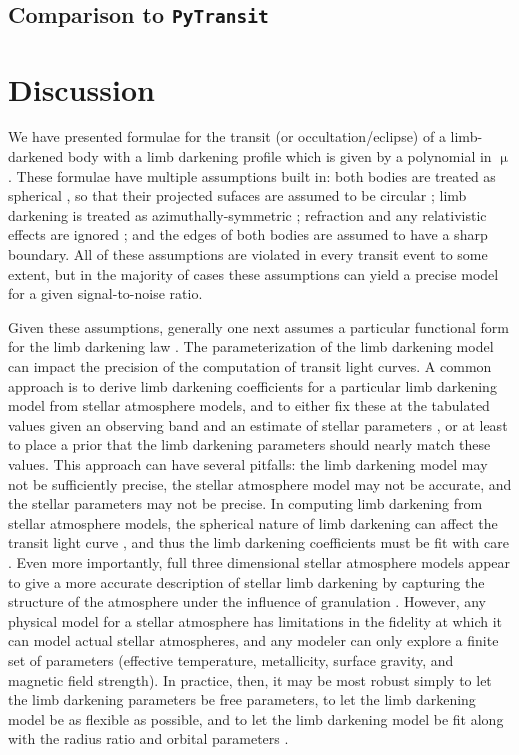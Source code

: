 \documentclass[modern]{aastex61}
\begin{document}
\subsection{Comparison to \texttt{PyTransit}}

\section{Discussion}

We have presented formulae for the transit (or occultation/eclipse) of a
limb-darkened body with a limb darkening profile which is given by a polynomial
in $\upmu$.  These formulae have multiple assumptions built in:  both bodies
are treated as spherical \citep[but see][]{Seager2002,Hui2002}, so that their projected
sufaces are assumed to be circular \citep[but see][]{Barnes2003,Barnes2004,Barnes2009b,
DobbsDixon2012};  limb darkening is treated as azimuthally-symmetric \citep[but see][]{Barnes2009a}; 
refraction and any relativistic effects are ignored \citep[but see][]{Sidis2010}; 
and the edges of both bodies are assumed to have a sharp boundary.
All of these assumptions are violated in every transit event to some extent,
but in the majority of cases these assumptions can yield a precise model for 
a given signal-to-noise ratio.

Given these assumptions, generally one next assumes a particular functional
form for the limb darkening law \citep{Csizmadia2018}.  The parameterization of 
the limb darkening model can impact the precision of the computation
of transit light curves.  A common approach is to derive limb darkening
coefficients for a particular limb darkening model from stellar atmosphere models, 
and to either fix these at the tabulated values given an observing band and an 
estimate of stellar parameters \citep{Claret2011,Howarth2011}, or at least to place 
a prior that the limb darkening parameters should nearly match these values.
This approach can have several pitfalls:  the limb darkening model may not be
sufficiently precise,  the stellar atmosphere model may not be accurate, and
the stellar parameters may not be precise.
In computing limb darkening from stellar atmosphere models, 
the spherical nature of limb darkening can affect the transit light curve
\citep{Neilson2013,Neilson2017}, and thus the limb darkening coefficients must be fit
with care \citep{Claret2018}.  Even more importantly, full three dimensional
stellar atmosphere models appear to give a more accurate description of
stellar limb darkening by capturing the structure of the atmosphere under
the influence of granulation \citep{Hayek2012,Magic2015}.  However, any
physical model for a stellar atmosphere has limitations in the fidelity at
which it can model actual stellar atmospheres,
and any modeler can only explore a finite set of parameters (effective temperature,
metallicity, surface gravity, and magnetic field strength).
In practice, then, it may be most robust simply to let the limb darkening parameters 
be free parameters, to let the limb darkening model be as flexible as possible, 
and to let the limb darkening model be fit along with the radius ratio and
orbital parameters \citep{Csizmadia2012,Espinoza2015}.
\end{document}
